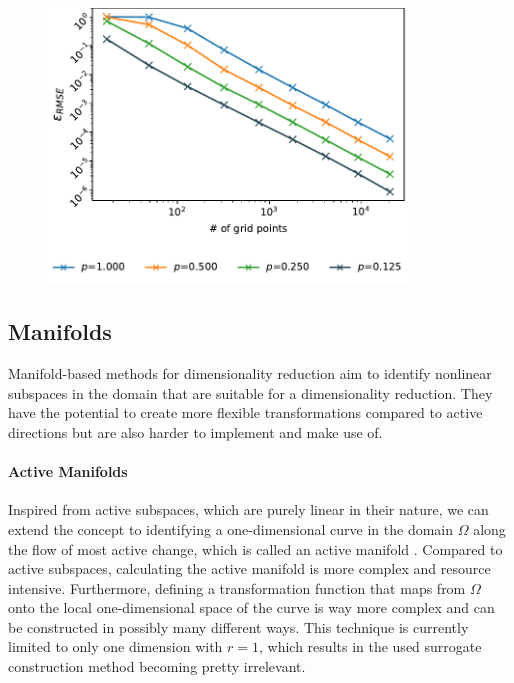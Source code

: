 \documentclass[
  a4paper,  %
  twoside,  %
  bibliography=totoc,
  headsepline,
  cleardoublepage=empty,
  parskip=half,
  draft=false
]{scrbook}
\begin{document}
\begin{mdframed}[style=style]
\vspace{2mm}
\begin{figure}[H]
        \centering
\begin{minipage}{.35\textwidth}
        \centering
\label{fig:periodic}
    \end{minipage}%
    \begin{minipage}{0.65\textwidth}
        \centering
\includegraphics[width=0.85\textwidth]{graphics/periodic}
    \end{minipage}
\end{figure}
\end{mdframed}

\subsection{Manifolds}

Manifold-based methods for dimensionality reduction aim to identify nonlinear subspaces in the domain that are suitable for a dimensionality reduction.
They have the potential to create more flexible transformations compared to active directions but are also harder to implement and make use of.

\paragraph{Active Manifolds}
Inspired from active subspaces, which are purely linear in their nature, we can extend the concept to identifying a one-dimensional curve in the domain $\Omega$ along the flow of most active change, which is called an active manifold \cite{Bridges2019}.
Compared to active subspaces, calculating the active manifold is more complex and resource intensive.
Furthermore, defining a transformation function that maps from $\Omega$ onto the local one-dimensional space of the curve is way more complex and can be constructed in possibly many different ways.
This technique is currently limited to only one dimension with $r=1$, which results in the used surrogate construction method becoming pretty irrelevant.
\end{document}
